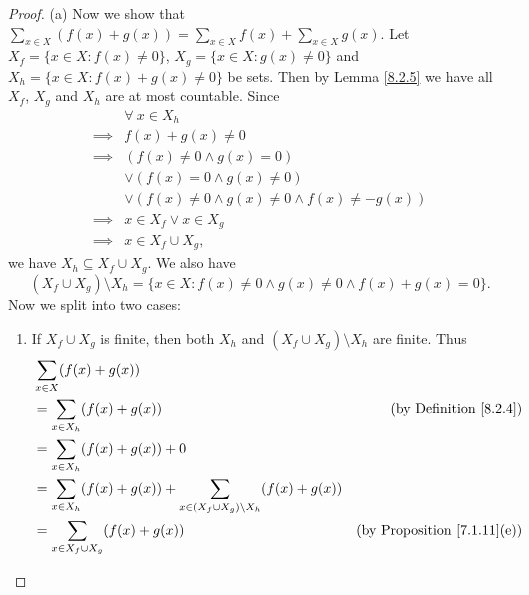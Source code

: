 \begin{proof}{(a)}
    Now we show that \(\sum_{x \in X} (f(x) + g(x)) = \sum_{x \in X} f(x) + \sum_{x \in X} g(x)\).
    Let \(X_f = \{x \in X : f(x) \neq 0\}\), \(X_g = \{x \in X : g(x) \neq 0\}\) and \(X_h = \{x \in X : f(x) + g(x) \neq 0\}\) be sets.
    Then by Lemma \ref{8.2.5} we have all \(X_f\), \(X_g\) and \(X_h\) are at most countable.
    Since
    \begin{align*}
                 & \forall\ x \in X_h                                         \\
        \implies & f(x) + g(x) \neq 0                                         \\
        \implies & (f(x) \neq 0 \land g(x) = 0)                               \\
                 & \lor (f(x) = 0 \land g(x) \neq 0)                          \\
                 & \lor (f(x) \neq 0 \land g(x) \neq 0 \land f(x) \neq -g(x)) \\
        \implies & x \in X_f \lor x \in X_g                                   \\
        \implies & x \in X_f \cup X_g,
    \end{align*}
    we have \(X_h \subseteq X_f \cup X_g\).
    We also have
    \[
        (X_f \cup X_g) \setminus X_h = \{x \in X : f(x) \neq 0 \land g(x) \neq 0 \land f(x) + g(x) = 0\}.
    \]
    Now we split into two cases:
    \begin{enumerate}[label=(\Roman*)]
        \item If \(X_f \cup X_g\) is finite, then both \(X_h\) and \((X_f \cup X_g) \setminus X_h\) are finite.
              Thus
              \begin{align*}
                   & \sum_{x \in X} (f(x) + g(x))                                                                                                         \\
                   & = \sum_{x \in X_h} (f(x) + g(x))                                                           & \text{(by Definition \ref{8.2.4})}      \\
                   & = \sum_{x \in X_h} (f(x) + g(x)) + 0                                                                                                 \\
                   & = \sum_{x \in X_h} (f(x) + g(x)) + \sum_{x \in (X_f \cup X_g) \setminus X_h} (f(x) + g(x))                                           \\
                   & = \sum_{x \in X_f \cup X_g} (f(x) + g(x))                                                  & \text{(by Proposition \ref{7.1.11}(e))} \\

\end{align*}
\end{enumerate}
\end{proof}
